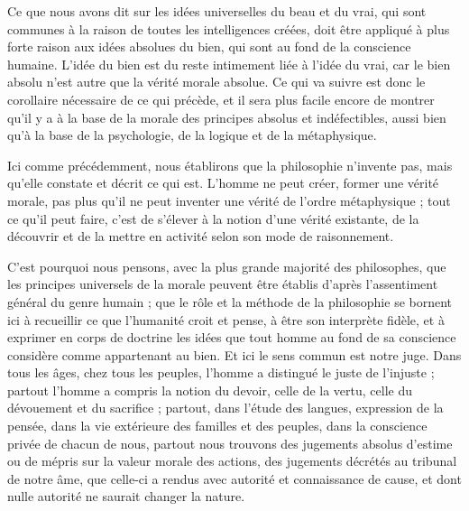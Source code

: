 \documentclass[a4paper, 11pt, oneside, landscape]{article}
\begin{document}
Ce que nous avons dit sur les idées universelles du beau et du vrai, qui sont communes à la raison de toutes les intelligences créées, doit être appliqué à plus forte raison aux idées absolues du bien, qui sont au fond de la conscience humaine. L'idée du bien est du reste intimement liée à l'idée du vrai, car le bien absolu n'est autre que la vérité morale absolue. Ce qui va suivre est donc le corollaire nécessaire de ce qui précède, et il sera plus facile encore de montrer qu'il y a à la base de la morale des principes absolus et indéfectibles, aussi bien qu'à la base de la psychologie, de la logique et de la métaphysique.

Ici comme précédemment, nous établirons que la philosophie n'invente pas, mais qu'elle constate et décrit ce qui est. L'homme ne peut créer, former une vérité morale, pas plus qu'il ne peut inventer une vérité de l'ordre métaphysique ; tout ce qu'il peut faire, c'est de s'élever à la notion d'une vérité existante, de la découvrir et de la mettre en activité selon son mode de raisonnement.

C'est pourquoi nous pensons, avec la plus grande majorité des philosophes, que les principes universels de la morale peuvent être établis d'après l'assentiment général du genre humain ; que le rôle et la méthode de la philosophie se bornent ici à recueillir ce que l'humanité croit et pense, à être son interprète fidèle, et à exprimer en corps de doctrine les idées que tout homme au fond de sa conscience considère comme appartenant au bien. Et ici le sens commun est notre juge. Dans tous les âges, chez tous les peuples, l'homme a distingué le juste de l'injuste ; partout l'homme a compris la notion du devoir, celle de la vertu, celle du dévouement et du sacrifice ; partout, dans l'étude des langues, expression de la pensée, dans la vie extérieure des familles et des peuples, dans la conscience privée de chacun de nous, partout nous trouvons des jugements absolus d'estime ou de mépris sur la valeur morale des actions, des jugements décrétés au tribunal de notre âme, que celle-ci a rendus avec autorité et connaissance de cause, et dont nulle autorité ne saurait changer la nature.
\end{document}
